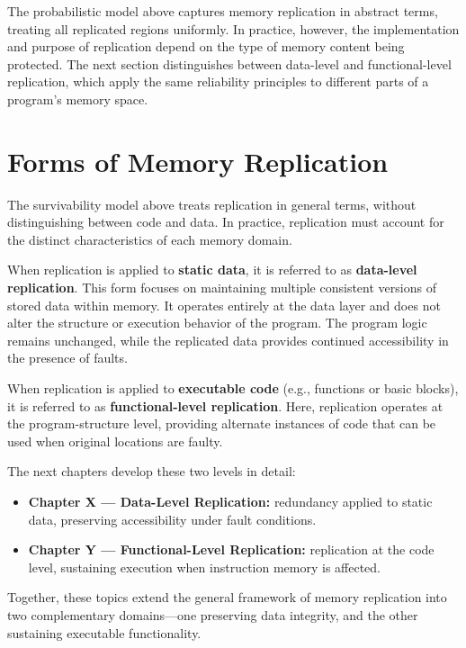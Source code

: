The probabilistic model above captures memory replication in abstract terms, 
treating all replicated regions uniformly. 
In practice, however, the implementation and purpose of replication 
depend on the type of memory content being protected. 
The next section distinguishes between data-level and functional-level replication, 
which apply the same reliability principles to different parts of a program's memory space.

\section{Forms of Memory Replication}
\label{sec:forms-mem-replication}

The survivability model above treats replication in general terms, without distinguishing between code and data. In practice, replication must account for the distinct characteristics of each memory domain.

When replication is applied to \textbf{static data}, it is referred to as \textbf{data-level replication}. This form focuses on maintaining multiple consistent versions of stored data within memory. It operates entirely at the data layer and does not alter the structure or execution behavior of the program. The program logic remains unchanged, while the replicated data provides continued accessibility in the presence of faults.

When replication is applied to \textbf{executable code} (e.g., functions or basic blocks), it is referred to as \textbf{functional-level replication}. Here, replication operates at the program-structure level, providing alternate instances of code that can be used when original locations are faulty.

The next chapters develop these two levels in detail:
\begin{itemize}
  \item \textbf{Chapter X — Data-Level Replication:} redundancy applied to static data, preserving accessibility under fault conditions.
  \item \textbf{Chapter Y — Functional-Level Replication:} replication at the code level, sustaining execution when instruction memory is affected.
\end{itemize}

Together, these topics extend the general framework of memory replication into two complementary domains—one preserving data integrity, and the other sustaining executable functionality.
